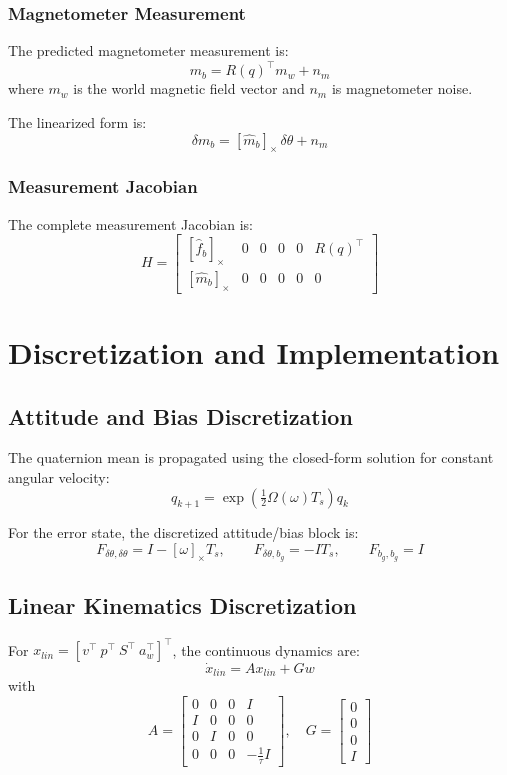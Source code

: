 \documentclass[11pt,letterpaper]{article}
\begin{document}
\subsubsection{Magnetometer Measurement}

The predicted magnetometer measurement is:
\[
m_b = R(q)^\top m_w + n_m
\]
where $m_w$ is the world magnetic field vector and $n_m$ is magnetometer noise.

The linearized form is:
\[
\delta m_b = [\hat m_b]_\times \,\delta\theta + n_m
\]

\subsubsection{Measurement Jacobian}

The complete measurement Jacobian is:
\[
H =
\begin{bmatrix}
[\hat f_b]_\times & 0 & 0 & 0 & 0 & R(q)^\top \\
[\hat m_b]_\times & 0 & 0 & 0 & 0 & 0
\end{bmatrix}
\]

\section{Discretization and Implementation}
\label{sec:discretization}

\subsection{Attitude and Bias Discretization}

The quaternion mean is propagated using the closed-form solution for constant angular velocity:
\[
q_{k+1} = \exp\left(\tfrac{1}{2}\Omega(\omega)T_s\right) q_k
\]

For the error state, the discretized attitude/bias block is:
\[
F_{\delta\theta,\delta\theta} = I - [\omega]_\times T_s,\qquad
F_{\delta\theta,b_g} = -I T_s,\qquad
F_{b_g,b_g}=I
\]

\subsection{Linear Kinematics Discretization}

For $x_{lin}=[v^\top\ p^\top\ S^\top\ a_w^\top]^\top$, the continuous dynamics are:
\[
\dot x_{lin} = A x_{lin} + G w
\]
with
\[
A = \begin{bmatrix}
0 & 0 & 0 & I \\
I & 0 & 0 & 0 \\
0 & I & 0 & 0 \\
0 & 0 & 0 & -\tfrac{1}{\tau} I
\end{bmatrix},\quad
G=\begin{bmatrix}0\\0\\0\\I\end{bmatrix}
\]
\end{document}
